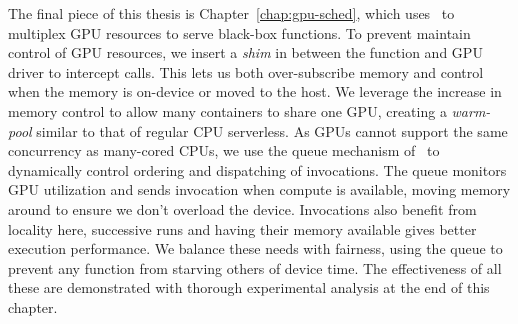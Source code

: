 The final piece of this thesis is Chapter~\ref{chap:gpu-sched}, which uses \sysname~to multiplex GPU resources to serve black-box functions.
To prevent maintain control of GPU resources, we insert a \emph{shim} in between the function and GPU driver to intercept calls.
This lets us both over-subscribe memory and control when the memory is on-device or moved to the host.
We leverage the increase in memory control to allow many containers to share one GPU, creating a \emph{warm-pool} similar to that of regular CPU serverless.
As GPUs cannot support the same concurrency as many-cored CPUs, we use the queue mechanism of \sysname~to dynamically control ordering and dispatching of invocations.
The queue monitors GPU utilization and sends invocation when compute is available, moving memory around to ensure we don't overload the device.
Invocations also benefit from locality here, successive runs and having their memory available gives better execution performance.
We balance these needs with fairness, using the queue to prevent any function from starving others of device time.
The effectiveness of all these are demonstrated with thorough experimental analysis at the end of this chapter.

